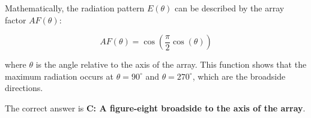Mathematically, the radiation pattern \( E(\theta) \) can be described by the array factor \( AF(\theta) \):

\[
AF(\theta) = \cos\left(\frac{\pi}{2} \cos(\theta)\right)
\]

where \( \theta \) is the angle relative to the axis of the array. This function shows that the maximum radiation occurs at \( \theta = 90^\circ \) and \( \theta = 270^\circ \), which are the broadside directions.

The correct answer is \textbf{C: A figure-eight broadside to the axis of the array}.

